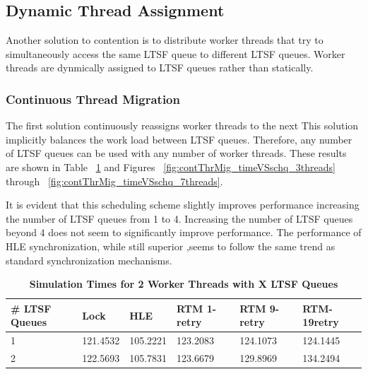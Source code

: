 \documentclass[11pt]{book}
\begin{document}
\subsection{Dynamic Thread Assignment}

Another solution to contention is to distribute worker threads that try to
simultaneously access the same LTSF queue to different LTSF queues.  Worker
threads are dynmically assigned to LTSF queues rather than statically.  

\subsubsection{Continuous Thread Migration}

The first solution continuously reassigns worker threads to the next  
This solution implicitly balances the work load between LTSF queues.  Therefore,
any number of LTSF queues can be used with any number of worker threads.  These
results are shown in Table ~\ref{tab:contThrMig_2threadsXschq} and Figures
~\ref{fig:contThrMig_timeVSschq_3threads} through
~\ref{fig:contThrMig_timeVSschq_7threads}. 

It is evident that this scheduling scheme slightly improves performance
increasing the number of LTSF queues from 1 to 4.  Increasing the number of LTSF
queues beyond 4 does not seem to significantly improve performance.  The
performance of HLE synchronization, while still superior ,seems to follow the
same trend as standard synchronization mechanisms.

\begin{table}[H]
    \centering
    \begin{tabular}{l|p{2cm}|p{2cm}|p{2cm}|p{2cm}|p{2cm}}
        \textbf{\# LTSF Queues}&Lock &HLE &RTM 1-retry &RTM 9-retry &RTM-19retry \\
        \hline
        \midrule
            1 &121.4532  &105.2221 &123.2083  &124.1073 &124.1445 \\ 
            2 &122.5693  &105.7831 &123.6679  &129.8969 &134.2494 \\
    \end{tabular}
    \caption{\textbf{Simulation Times for 2 Worker Threads with X LTSF Queues}}
    \label{tab:contThrMig_2threadsXschq}
\end{table}
\end{document}
